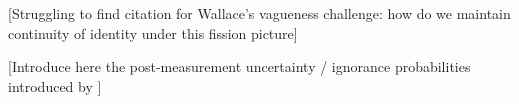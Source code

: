 \documentclass{article}
\begin{document}
[Struggling to find citation for Wallace’s vagueness challenge: how do we maintain continuity of identity under this fission picture]

[Introduce here the post-measurement uncertainty / ignorance probabilities introduced by \parencite{vaidmanSchizophrenicExperiencesNeutron1998}]

\printbibliography[heading=bibnumbered]
\end{document}
